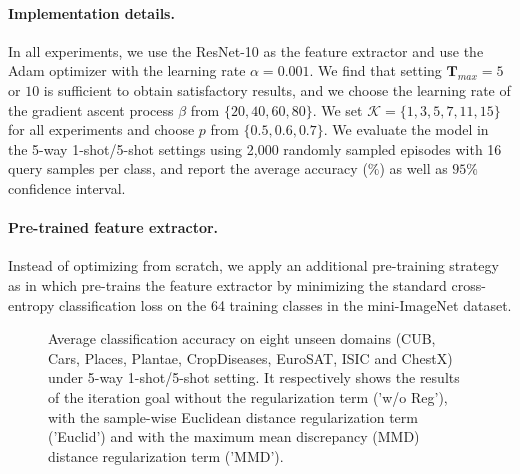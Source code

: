 \documentclass{article}
\begin{document}
\paragraph{Implementation details.} In all experiments, we use the ResNet-10 \cite{he2016deep} as the feature extractor and use the Adam optimizer with the learning rate $\alpha=0.001$. We find that setting $\mathbf{T}_{max}=5$ or $10$ is sufficient to obtain satisfactory results, and we choose the learning rate of the gradient ascent process $\beta$ from $\{20,40,60,80\}$. We set $\mathcal{K}=\{1,3,5,7,11,15\}$ for all experiments and choose $p$ from $\{0.5,0.6,0.7\}$. We evaluate the model in the 5-way 1-shot/5-shot settings using 2,000 randomly sampled episodes with 16 query samples per class, and report the average accuracy ($\%$) as well as $95\%$ confidence interval.

\paragraph{Pre-trained feature extractor.} Instead of optimizing from scratch, we apply an additional pre-training strategy as in \cite{DBLP:conf/iclr/TsengLH020} which pre-trains the feature extractor by minimizing the standard cross-entropy classification loss on the 64 training classes in the mini-ImageNet dataset.

\begin{figure}
    \centering
    \caption{Average classification accuracy on eight unseen domains (CUB, Cars, Places, Plantae, CropDiseases, EuroSAT, ISIC and ChestX) under 5-way 1-shot/5-shot setting. It respectively shows the results of the iteration goal without the regularization term ('w/o Reg'), with the sample-wise Euclidean distance regularization term ('Euclid') and with the maximum mean discrepancy (MMD) distance regularization term ('MMD').}
    \label{fig3}
\end{figure}
\end{document}
